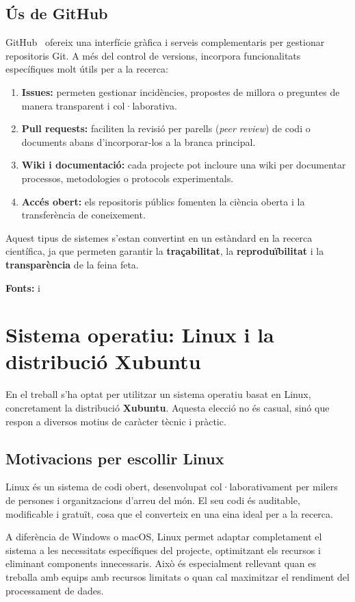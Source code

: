 \subsection{Ús de GitHub}
GitHub~\cite{GitHub} ofereix una interfície gràfica i serveis complementaris per gestionar repositoris Git. A més del control de versions, incorpora funcionalitats específiques molt útils per a la recerca:
\begin{enumerate}
  \item \textbf{Issues:} permeten gestionar incidències, propostes de millora o preguntes de manera transparent i col·laborativa.
  \item \textbf{Pull requests:} faciliten la revisió per parells (\textit{peer review}) de codi o documents abans d’incorporar-los a la branca principal.
  \item \textbf{Wiki i documentació:} cada projecte pot incloure una wiki per documentar processos, metodologies o protocols experimentals.
  \item \textbf{Accés obert:} els repositoris públics fomenten la ciència oberta i la transferència de coneixement.
\end{enumerate}

Aquest tipus de sistemes s’estan convertint en un estàndard en la recerca científica, ja que permeten garantir la \textbf{traçabilitat}, la \textbf{reproduïbilitat} i la \textbf{transparència} de la feina feta.

\textbf{Fonts:} \cite{A1} i~\cite{A2}
\section{Sistema operatiu: Linux i la distribució Xubuntu}
En el treball s’ha optat per utilitzar un sistema operatiu basat en Linux, concretament la distribució \textbf{Xubuntu}. Aquesta elecció no és casual, sinó que respon a diversos motius de caràcter tècnic i pràctic.

\subsection{Motivacions per escollir Linux}
Linux és un sistema de codi obert, desenvolupat col·laborativament per milers de persones i organitzacions d’arreu del món. El seu codi és auditable, modificable i gratuït, cosa que el converteix en una eina ideal per a la recerca.

A diferència de Windows o macOS, Linux permet adaptar completament el sistema a les necessitats específiques del projecte, optimitzant els recursos i eliminant components innecessaris. Això és especialment rellevant quan es treballa amb equips amb recursos limitats o quan cal maximitzar el rendiment del processament de dades.

